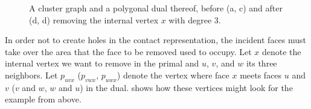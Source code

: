 \begin{figure}[H]
	\centering
	\quad
	\qquad
	\quad
	\caption{A cluster graph and a polygonal dual thereof, before (a, c) and after (d, d) removing the internal vertex $x$ with degree 3.}
	\label{fig:remove-vertex-example-internal}
\end{figure}

In order not to create holes in the contact representation, the incident faces must take over the area that the face to be removed used to occupy.
Let $x$ denote the internal vertex we want to remove in the primal and $u$, $v$, and $w$ its three neighbors.
Let $p_{uvx}$ ($p_{vwx}$, $p_{uwx}$) denote the vertex where face $x$ meets faces $u$ and $v$ ($v$ and $w$, $w$ and $u$) in the dual.
 shows how these vertices might look for the example from above.

